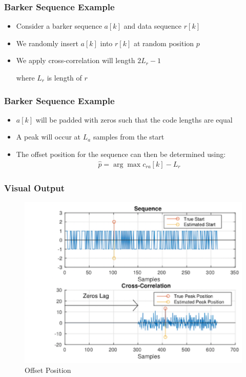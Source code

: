 \documentclass[10pt]{beamer}
\begin{document}
\frame
{
  \frametitle{Barker Sequence Example}

    \begin{itemize}
        \item Consider a barker sequence $a[k]$ and data sequence $r[k]$
        \item We randomly insert $a[k]$ into $r[k]$ at random position $p$
        \item We apply cross-correlation will length $2L_r - 1$ 
        
        where $L_r$ is length of $r$
    \end{itemize}

}

\frame
{
  \frametitle{Barker Sequence Example}

    \begin{itemize}
        \item $a[k]$ will be padded with zeros such that the code lengths are equal 
        \item A peak will occur at $L_a$ samples from the start 
        \item The offset position for the sequence can then be determined using: 
         \begin{equation}
        \begin{split}
        \hat{p} = \arg\max c_{ra}[k]-L_r
        \end{split}
        \end{equation} 
    \end{itemize}

}
\frame
{
  \frametitle{Visual Output}
    \begin{figure}
  				\includegraphics[width=0.8\linewidth, scale=0.5]{Output.eps}
 				 \caption{Offset Position}
  				\label{fig:Sample Barker Code implementation for sequence offset determination}
		\end{figure}

}
\end{document}
